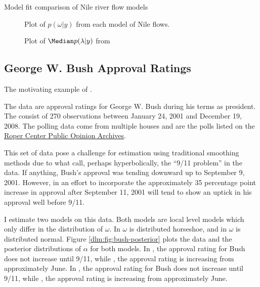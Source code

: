 \begin{table}[htpb]
  \centering
  \caption{Model fit comparison of Nile river flow models}
  \label{dlm:tab:nile-fits}
\end{table}

\begin{figure}[htpb]
  \centering
  \caption{Plot of $p(\omega | y)$ from each model of Nile flows.}
  \label{dlm:fig:nile-omega}
\end{figure}

\begin{figure}[htpb]
  \centering
  \caption{Plot of $\Median p(\lambda | y)$ from }
  \label{dlm:fig:nile-lambda}
\end{figure}

\clearpage{}

\subsection{George W. Bush Approval Ratings}
\label{dlm:sec:george-w.-bush}

The motivating example of \textcite{RatkovicEng2010}.

The data are approval ratings for George W. Bush during his terms as president.
The consist of 270 observations between January 24, 2001 and December 19, 2008.%
The polling data come from multiple houses and are the polls listed on the \href{http://webapps.ropercenter.uconn.edu/CFIDE/roper/presidential/webroot/presidential_rating_domegail.cfm?allRate=True&presidentName=Bush#.UbeB8HUbyv8}{Roper Center Public Opinion Archives}.

This set of data pose a challenge for estimation using traditional smoothing methods due to what \textcite{RatkovicEng2010} call, perhaps hyperbolically, the ``9/11 problem'' in the data.
If anything, Bush's approval was tending downward up to September 9, 2001.
However, in an effort to incorporate the approximately 35 percentage point increase in approval after September 11, 2001 will tend to show an uptick in his approval well before 9/11.

I estimate two models on this data. 
Both models are local level models which only differ in the distribution of $\omega$.
In  $\omega$ is distributed horseshoe, and in  $\omega$ is distributed normal.
Figure \ref{dlm:fig:bush-posterior} plots the data and the posterior distributions of $\alpha$ for both models.
In , the approval rating for Bush does not increase until 9/11, while , the approval rating is increasing from approximately June.
In , the approval rating for Bush does not increase until 9/11, while , the approval rating is increasing from approximately June.

